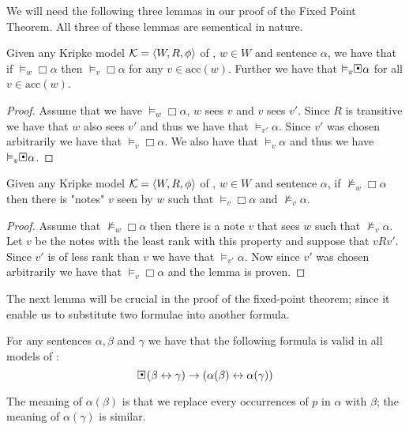 \documentclass[../main.tex]{subfiles}
\begin{document}
We will need the following three lemmas in our proof of the Fixed Point
Theorem.
All three of these lemmas are sementical in nature. 
\begin{lem}
	\label{lem:acc}
	Given any Kripke model $\mathcal{K}=\langle W,R,\phi\rangle$ of \GL, $w\in W$ and
	sentence $\alpha$, we have that if $\vDash_w\Box\alpha$ then
	$\vDash_v\Box\alpha$ for any $v\in\text{acc}(w)$. Further we have that
	$\vDash_v\sBox\alpha$ for all $v\in\text{acc}(w)$.
\end{lem}
\begin{proof}
	Assume that we have $\vDash_w\Box\alpha$, $w$ sees  $v$ and
	$v$ sees $v'$. Since $R$ is transitive we have that $w$ also sees $v'$ and thus we have that $\vDash_{v'}\alpha$. Since
	$v'$ was chosen arbitrarily we have that $\vDash_v\Box\alpha$. We also
	have that $\vDash_v\alpha$ and thus we have $\vDash_v\sBox\alpha$.
\end{proof}
\begin{lem}
	\label{lem:con}
	Given any Kripke model $\mathcal{K}=\langle W,R,\phi\rangle$ of \GL, $w\in W$ and
	sentence $\alpha$, if $\not\vDash_w\Box\alpha$ then there is "notes"
	$v$ seen by  $w$ such that $\vDash_v\Box\alpha$ and
	$\not\vDash_v\alpha$.
\end{lem}
\begin{proof}
	Assume that $\not\vDash_w\Box\alpha$ then there is a note $v$
	that sees  $w$ such that $\not\vDash_v\alpha$. Let $v$ be the notes
	with the least rank with this property and suppose that $vRv'$. Since
	$v'$ is of less rank than $v$ we have that $\vDash_{v'}\alpha$. Now
	since $v'$ was chosen arbitrarily we have that $\vDash_v\Box\alpha$ and
	the lemma is proven.
\end{proof}
The next lemma will be crucial in the proof of the fixed-point theorem; since
it enable us to substitute two formulae into another formula.
\begin{lem}
	\label{lem:sem}
	For any sentences $\alpha,\beta$ and $\gamma$ we have that the
	following formula is valid in all models of \GL:
	$$\sBox(\beta\leftrightarrow\gamma)\rightarrow(\alpha(\beta)\leftrightarrow\alpha(\gamma))$$
\end{lem}
The meaning of $\alpha(\beta)$ is that we replace every occurrences of $p$ in
$\alpha$ with $\beta$; the meaning of $\alpha(\gamma)$ is similar.
\end{document}
